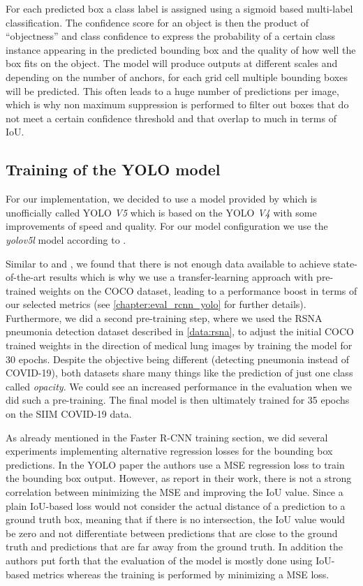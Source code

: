 For each predicted box a class label is assigned using a sigmoid based multi-label classification. The confidence score for an object is then the product of \enquote{objectness} and class confidence to express the probability of a certain class instance appearing in the predicted bounding box and the quality of how well the box fits on the object.
The model will produce outputs at different scales and depending on the number of anchors, for each grid cell multiple bounding boxes will be predicted. This often leads to a huge number of predictions per image, which is why non maximum suppression is performed to filter out boxes that do not meet a certain confidence threshold and that overlap to much in terms of \ac{IoU}.


\subsection*{Training of the \ac{YOLO} model}
For our implementation, we decided to use a model provided by \autocite{yolov5} which is unofficially called \ac{YOLO} \textit{V5} which is based on the \ac{YOLO} \textit{V4} with some improvements of speed and quality. For our model configuration we use the \textit{yolov5l} model according to \autocite{yolov5}.

Similar to \autocite{CoronaDLTransfer} and  \autocite{mangal2020covidaid}, we found that there is not enough data available to achieve state-of-the-art results which is why we use a transfer-learning approach with pre-trained weights on the \ac{COCO} \autocite{coco} dataset, leading to a performance boost in terms of our selected metrics (see \vref{chapter:eval_rcnn_yolo} for further details). Furthermore, we did a second pre-training step, where we used the RSNA pneumonia detection dataset described in \vref{data:rsna}, to adjust the initial \ac{COCO} trained weights in the direction of medical lung images by training the model for $30$ epochs. Despite the objective being different (detecting pneumonia instead of COVID-19), both datasets share many things like the prediction of just one class called \textit{opacity}. We could see an increased performance in the evaluation when we did such a pre-training. The final model is then ultimately trained for 35 epochs on the SIIM COVID-19 data.

As already mentioned in the Faster \ac{R-CNN} training section, we did several experiments implementing alternative regression losses for the bounding box predictions. In the \ac{YOLO} paper the authors use a \ac{MSE} regression loss to train the bounding box output. However, as \citeauthor{giou} \autocite{giou} report in their work, there is not a strong correlation between minimizing the \ac{MSE} and improving the \ac{IoU} value. Since a plain \ac{IoU}-based loss would not consider the actual distance of a prediction to a ground truth box, meaning that if there is no intersection, the \ac{IoU} value would be zero and not differentiate between predictions that are close to the ground truth and predictions that are far away from the ground truth.
In addition the authors put forth that the evaluation of the model is mostly done using \ac{IoU}-based metrics whereas the training is performed by minimizing a \ac{MSE} loss.

